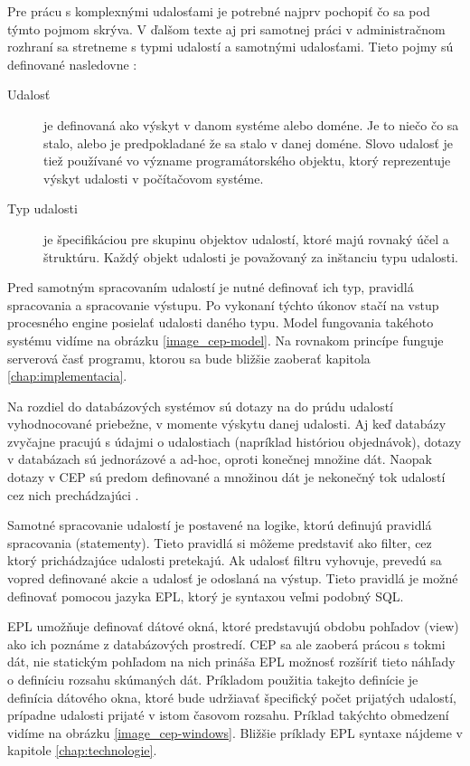 	Pre prácu s komplexnými udalosťami je potrebné najprv pochopiť čo sa pod týmto pojmom skrýva. V ďalšom texte aj pri samotnej práci v administračnom rozhraní sa stretneme s typmi udalostí a samotnými udalosťami. Tieto pojmy sú definované nasledovne \cite{etzion2011event}:
	
	\begin{description}
		\item[Udalosť] je definovaná ako výskyt v danom systéme alebo doméne. Je to niečo čo sa stalo, alebo je predpokladané že sa stalo v danej doméne. Slovo udalosť je tiež používané vo význame programátorského objektu, ktorý reprezentuje výskyt udalosti v počítačovom systéme.
		
		\item[Typ udalosti] je špecifikáciou pre skupinu objektov udalostí, ktoré majú rovnaký účel a štruktúru. Každý objekt udalosti je považovaný za inštanciu typu udalosti.
	\end{description}

	Pred samotným spracovaním udalostí je nutné definovať ich typ, pravidlá spracovania a spracovanie výstupu. Po vykonaní týchto úkonov stačí na vstup procesného engine posielať udalosti daného typu. Model fungovania takéhoto systému vidíme na obrázku \ref{image_cep-model}. Na rovnakom princípe funguje serverová časť programu, ktorou sa bude bližšie zaoberať kapitola \ref{chap:implementacia}.
	
	Na rozdiel do databázových systémov sú dotazy na do prúdu udalostí vyhodnocované priebežne, v momente výskytu danej udalosti. Aj keď databázy zvyčajne pracujú s údajmi o udalostiach (napríklad históriou objednávok), dotazy v databázach sú jednorázové a ad-hoc, oproti konečnej množine dát. Naopak dotazy v CEP sú predom definované a množinou dát je nekonečný tok udalostí cez nich prechádzajúci \cite{web:ceptranslated}.
		
	Samotné spracovanie udalostí je postavené na logike, ktorú definujú pravidlá spracovania (statementy). Tieto pravidlá si môžeme predstaviť ako filter, cez ktorý prichádzajúce udalosti pretekajú. Ak udalosť filtru vyhovuje, prevedú sa vopred definované akcie a udalosť je odoslaná na výstup.	Tieto pravidlá je možné definovať pomocou jazyka EPL, ktorý je syntaxou veľmi podobný SQL.
	
	EPL umožňuje definovať dátové okná, ktoré predstavujú obdobu pohľadov (view) ako ich poznáme z databázových prostredí. CEP sa ale zaoberá prácou s tokmi dát, nie statickým pohľadom na nich prináša EPL možnosť rozšíriť tieto náhľady o definíciu rozsahu skúmaných dát. Príkladom použitia takejto definície je definícia dátového okna, ktoré bude udržiavať špecifický počet prijatých udalostí, prípadne udalosti prijaté v istom časovom rozsahu. Príklad takýchto obmedzení vidíme na obrázku \ref{image_cep-windows}. Bližšie príklady EPL syntaxe nájdeme v kapitole \ref{chap:technologie}.

